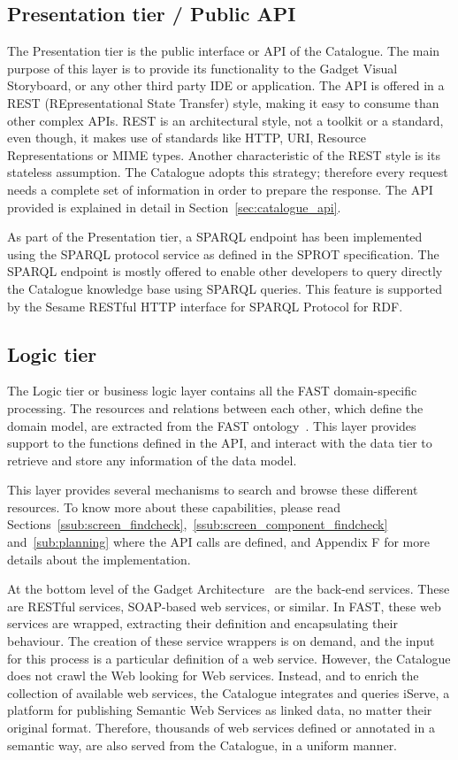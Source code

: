 \documentclass{fast_latex}
\begin{document}
\subsection{Presentation tier / Public API}

The Presentation tier is the public interface or API of the Catalogue. The main purpose of this layer is to provide its functionality to the Gadget Visual Storyboard, or any other third party IDE or application. The API is offered in a REST (REpresentational State Transfer) style, making it easy to consume than other complex APIs. REST is an architectural style, not a toolkit or a standard, even though, it makes use of standards like HTTP, URI, Resource Representations or MIME types. Another characteristic of the REST style is its stateless assumption. The Catalogue adopts this strategy; therefore every request needs a complete set of information in order to prepare the response. The API provided is explained in detail in Section~\ref{sec:catalogue_api}.

As part of the Presentation tier, a SPARQL endpoint has been implemented using the SPARQL protocol service as defined in the SPROT \cite{sprot} specification. The SPARQL endpoint is mostly offered to enable other developers to query directly the Catalogue knowledge base using SPARQL queries. This feature is supported by the Sesame RESTful HTTP interface for SPARQL Protocol for RDF.

\subsection{Logic tier}
\label{ssec:logic_tier}

The Logic tier or business logic layer contains all the FAST domain-specific processing. The resources and relations between each other, which define the domain model, are extracted from the FAST ontology~\cite{moeller2011fast_ontology}. This layer provides support to the functions defined in the API, and interact with the data tier to retrieve and store any information of the data model.

This layer provides several mechanisms to search and browse these different resources. To know more about these capabilities, please read Sections~\ref{ssub:screen_findcheck},~\ref{ssub:screen_component_findcheck} and~\ref{sub:planning} where the API calls are defined, and Appendix F for more details about the implementation.

At the bottom level of the Gadget Architecture~\cite{reyes2011gadget_architecture} are the back-end services. These are RESTful services, SOAP-based web services, or similar. In FAST, these web services are wrapped, extracting their definition and encapsulating their behaviour. The creation of these service wrappers is on demand, and the input for this process is a particular definition of a web service. However, the Catalogue does not crawl the Web looking for Web services. Instead, and to enrich the collection of available web services, the Catalogue integrates and queries iServe, a platform for publishing Semantic Web Services as linked data, no matter their original format. Therefore, thousands of web services defined or annotated in a semantic way, are also served from the Catalogue, in a uniform manner.
\end{document}
